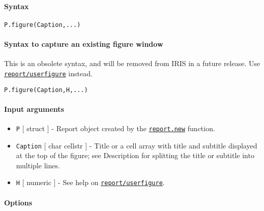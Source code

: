 


	\paragraph{Syntax}

\begin{verbatim}
P.figure(Caption,...)
\end{verbatim}

\paragraph{Syntax to capture an existing figure
window}

This is an obsolete syntax, and will be removed from IRIS in a future
release. Use \href{report/userfigure}{\texttt{report/userfigure}}
instead.

\begin{verbatim}
P.figure(Caption,H,...)
\end{verbatim}

\paragraph{Input arguments}

\begin{itemize}
\item
  \texttt{P} {[} struct {]} - Report object created by the
  \href{report/new}{\texttt{report.new}} function.
\item
  \texttt{Caption} {[} char \textbar{} cellstr {]} - Title or a cell
  array with title and subtitle displayed at the top of the figure; see
  Description for splitting the title or subtitle into multiple lines.
\item
  \texttt{H} {[} numeric {]} - See help on
  \href{report/userfigure}{\texttt{report/userfigure}}.
\end{itemize}

\paragraph{Options}

